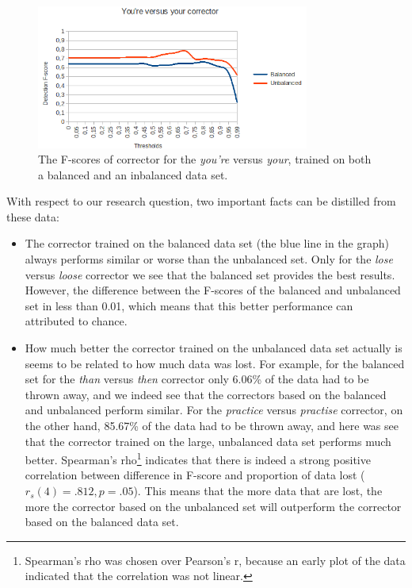 \documentclass[12pt]{article}
\begin{document}
\begin{figure}[H]
\centering
\includegraphics[width=0.8\textwidth]{fscore_you'reyour.png}
\caption{The F-scores of corrector for the \emph{you're} versus \emph{your}, trained on both a balanced and an inbalanced data set.}
\end{figure}

With respect to our research question, two important facts can be distilled from these data:

\begin{itemize}

\item The corrector trained on the balanced data set (the blue line in the graph) always performs similar or worse than the unbalanced set. Only for the \emph{lose} versus \emph{loose} corrector we see that the balanced set provides the best results. However, the difference between the F-scores of the balanced and unbalanced set in less than 0.01, which means that this better performance can attributed to chance.
\item How much better the corrector trained on the unbalanced data set actually is seems to be related to how much data was lost. For example, for the balanced set for the \emph{than} versus \emph{then} corrector only 6.06\% of the data had to be thrown away, and we indeed see that the correctors based on the balanced and unbalanced perform similar. For the \emph{practice} versus \emph{practise} corrector, on the other hand, 85.67\% of the data had to be thrown away, and here was see that the corrector trained on the large, unbalanced data set performs much better. Spearman's rho\footnote{Spearman's rho was chosen over Pearson's r, because an early plot of the data indicated that the correlation was not linear.} indicates that there is indeed a strong positive correlation between difference in F-score and proportion of data lost ($r_s(4)=.812, p=.05$). This means that the more data that are lost, the more the corrector based on the unbalanced set will outperform the corrector based on the balanced data set.

\end{itemize}
\end{document}
